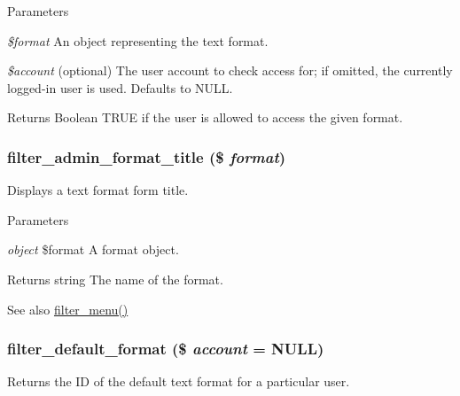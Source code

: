 \begin{DoxyParams}{Parameters}
\item[{\em \$format}]An object representing the text format. \item[{\em \$account}](optional) The user account to check access for; if omitted, the currently logged-\/in user is used. Defaults to NULL.\end{DoxyParams}
\begin{DoxyReturn}{Returns}
Boolean TRUE if the user is allowed to access the given format. 
\end{DoxyReturn}
\hypertarget{filter_8module_a3f678da61808bcc3d299fcb01f52e79a}{
\subsubsection[{filter\_\-admin\_\-format\_\-title}]{\setlength{\rightskip}{0pt plus 5cm}filter\_\-admin\_\-format\_\-title (\$ {\em format})}}
\label{filter_8module_a3f678da61808bcc3d299fcb01f52e79a}
Displays a text format form title.


\begin{DoxyParams}{Parameters}
\item[{\em object}]\$format A format object.\end{DoxyParams}
\begin{DoxyReturn}{Returns}
string The name of the format.
\end{DoxyReturn}
\begin{DoxySeeAlso}{See also}
\hyperlink{filter_8module_a13c5612763d7d98499832594ac3d5466}{filter\_\-menu()} 
\end{DoxySeeAlso}
\hypertarget{filter_8module_a187d29b1feb447737d57276e06655312}{
\subsubsection[{filter\_\-default\_\-format}]{\setlength{\rightskip}{0pt plus 5cm}filter\_\-default\_\-format (\$ {\em account} = {\ttfamily NULL})}}
\label{filter_8module_a187d29b1feb447737d57276e06655312}
Returns the ID of the default text format for a particular user.

